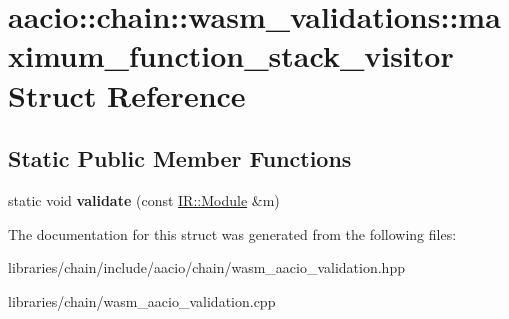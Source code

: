 \hypertarget{structaacio_1_1chain_1_1wasm__validations_1_1maximum__function__stack__visitor}{}\section{aacio\+:\+:chain\+:\+:wasm\+\_\+validations\+:\+:maximum\+\_\+function\+\_\+stack\+\_\+visitor Struct Reference}
\label{structaacio_1_1chain_1_1wasm__validations_1_1maximum__function__stack__visitor}
\subsection*{Static Public Member Functions}
\begin{DoxyCompactItemize}
\item 
\mbox{\label{structaacio_1_1chain_1_1wasm__validations_1_1maximum__function__stack__visitor_ad3f56200583761aa438ed81e0880125f}} 
static void {\bfseries validate} (const \mbox{\hyperlink{struct_i_r_1_1_module}{I\+R\+::\+Module}} \&m)
\end{DoxyCompactItemize}


The documentation for this struct was generated from the following files\+:\begin{DoxyCompactItemize}
\item 
libraries/chain/include/aacio/chain/wasm\+\_\+aacio\+\_\+validation.\+hpp\item 
libraries/chain/wasm\+\_\+aacio\+\_\+validation.\+cpp\end{DoxyCompactItemize}
